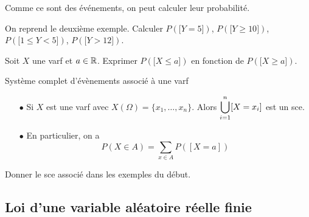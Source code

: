 \documentclass[a4paper, 11pt]{article}
\begin{document}
Comme ce sont des \'ev\'enements, on peut calculer leur probabilit\'e.

\begin{exemple} 
On reprend le deuxi\`eme exemple. Calculer $P(\lbrack Y=5\rbrack)$, $P(\lbrack Y \geq 10 \rbrack)$, $P(\lbrack 1\leq Y< 5\rbrack)$, $P(\lbrack Y>12\rbrack)$.
\end{exemple}

{\footnotesize \begin{exercice} Soit $X$ une varf et $a\in\mathbb{R}$. Exprimer $P(\lbrack X \leq a\rbrack)$ en fonction de  $P(\lbrack X\geq a\rbrack)$.
\end{exercice}}





 {  

\begin{prop} Syst\`{e}me complet d'\'ev\`{e}nements associ\'e \`{a} une varf
\begin{itemize}
\item[$\bullet$] Si $X$ est une varf avec $X(\Omega)=\lbrace x_1,\dots, x_n\rbrace$.
 Alors $\displaystyle \bigcup_{i=1}^n [X=x_i]$ est un sce.
\item[$\bullet$] En particulier, on a
$$P(X\in A)=\sum_{x\in A} P([X=a])$$


\end{itemize}
\end{prop}
 
}

\begin{exemple} 
Donner le sce associ\'e dans les exemples du d\'ebut.

\end{exemple}

\subsection{Loi d'une variable al\'eatoire r\'eelle finie}

\end{document}
